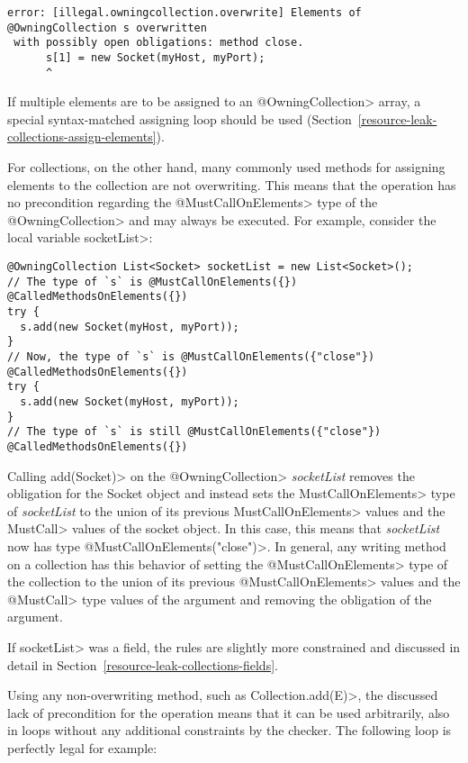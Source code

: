 \begin{verbatim}
error: [illegal.owningcollection.overwrite] Elements of @OwningCollection s overwritten
 with possibly open obligations: method close.
      s[1] = new Socket(myHost, myPort);
      ^
\end{verbatim}

If multiple elements are to be assigned to an \<@OwningCollection> array, a special syntax-matched assigning loop should be used (Section~\ref{resource-leak-collections-assign-elements}).

For collections, on the other hand, many commonly used methods for assigning elements to the collection are not overwriting. This means that the operation has no precondition regarding the \<@MustCallOnElements> type of the \<@OwningCollection> and may always be executed. For example, consider the local variable \<socketList>:

\begin{verbatim}
@OwningCollection List<Socket> socketList = new List<Socket>();
// The type of `s` is @MustCallOnElements({}) @CalledMethodsOnElements({})
try {
  s.add(new Socket(myHost, myPort));
}
// Now, the type of `s` is @MustCallOnElements({"close"}) @CalledMethodsOnElements({})
try {
  s.add(new Socket(myHost, myPort));
}
// The type of `s` is still @MustCallOnElements({"close"}) @CalledMethodsOnElements({})
\end{verbatim}

Calling \<add(Socket)> on the \<@OwningCollection> \textit{socketList} removes the obligation for the Socket object and instead sets the \<MustCallOnElements> type of \textit{socketList} to the union of its previous \<MustCallOnElements> values and the \<MustCall> values of the socket object. In this case, this means that \textit{socketList} now has type  \<@MustCallOnElements({"close"})>. In general, any writing method on a collection has this behavior of setting the \<@MustCallOnElements> type of the collection to the union of its previous \<@MustCallOnElements> values and the \<@MustCall> type values of the argument and removing the obligation of the argument.

If \<socketList> was a field, the rules are slightly more constrained and discussed in detail in Section~\ref{resource-leak-collections-fields}.

Using any non-overwriting method, such as \<Collection.add(E)>, the discussed lack of precondition for the operation means that it can be used arbitrarily, also in loops without any additional constraints by the checker. The following loop is perfectly legal for example:

